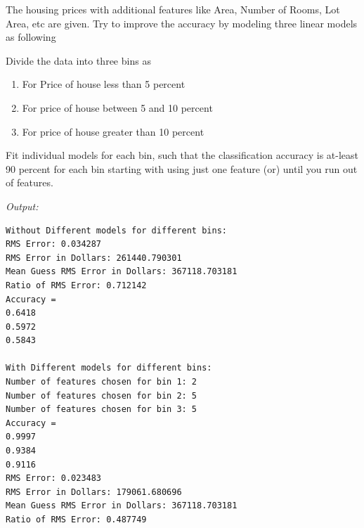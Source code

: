\documentclass[book.tex]{subfiles}
\begin{document}
\begin{example} The housing prices with additional features like Area, Number of Rooms, Lot Area, etc are given. Try to improve the accuracy by modeling three linear models as following

Divide the data into three bins as
\begin{enumerate}
\item For Price of house less than 5 percent
\item For price of house between 5 and 10 percent
\item For price of house greater than 10 percent
\end{enumerate}

Fit individual models for each bin, such that the classification accuracy is at-least 90 percent for each bin starting with using just one feature (or) until you run out of features.

\textit{Output: } 
\begin{Verbatim}
Without Different models for different bins: 
RMS Error: 0.034287
RMS Error in Dollars: 261440.790301
Mean Guess RMS Error in Dollars: 367118.703181
Ratio of RMS Error: 0.712142
Accuracy =
0.6418
0.5972
0.5843

With Different models for different bins: 
Number of features chosen for bin 1: 2
Number of features chosen for bin 2: 5
Number of features chosen for bin 3: 5
Accuracy =
0.9997
0.9384
0.9116
RMS Error: 0.023483
RMS Error in Dollars: 179061.680696
Mean Guess RMS Error in Dollars: 367118.703181
Ratio of RMS Error: 0.487749
\end{Verbatim}



\end{example}
\end{document}
